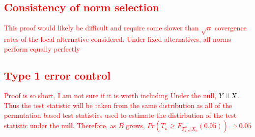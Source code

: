 \documentclass{article}
\newcommand{\sh}{\textcolor{red}}
\newcommand{\indep}{\raisebox{0.05em}{\rotatebox[origin=c]{90}{$\models$}}}
\newcommand{\rvo}{X}
\begin{document}
\sh{\subsection{Consistency of norm selection} 
This proof would likely be difficult and require some slower than $\sqrt{n}$ covergence rates of the local alternative considered.  Under fixed alternatives, all norms perform equally perfectly}

\sh{\subsection{Type 1 error control}
Proof is so short, I am not sure if it is worth including
Under the null, $Y \indep \rvo$.  Thus the test statistic will be taken from the same distribution as all of the permutation based test statistics used to estimate the distirbution of the test statistic under the null.  Therefore, as $B$ grows, $Pr(T_n \geq F_{T^\#_{k,n}|\rvo_n}(0.95)) \Rightarrow 0.05$
}



\end{document}
